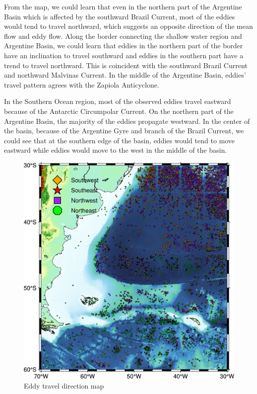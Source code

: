 From the map, we could learn that even in the northern part of the Argentine Basin which is affected by the southward Brazil Current, most of the eddies would tend to travel northward, which suggests an opposite direction of the mean flow and eddy flow. Along the border connecting the shallow water region and Argentine Basin, we could learn that eddies in the northern part of the border have an inclination to travel southward and eddies in the southern part have a trend to travel northward. This is coincident with the southward Brazil Current and northward Malvinas Current. In the middle of the Argentine Basin, eddies' travel pattern agrees with the Zapiola Anticyclone.

In the Southern Ocean region, most of the observed eddies travel eastward because of the Antarctic Circumpolar Current. On the northern part of the Argentine Basin, the majority of the eddies propagate westward.
In the center of the basin, because of the Argentine Gyre and branch of the Brazil Current, we could see that at the southern edge of the basin, eddies would tend to move eastward while eddies would move to the west in the middle of the basin.

\begin{figure}
    \centering
    \includegraphics[width = 15cm]{chapter/figure/eddy classification map_SNWE2.png}
    \caption{Eddy travel direction map}
    \label{eddy classification map_SNWE2}
\end{figure}

